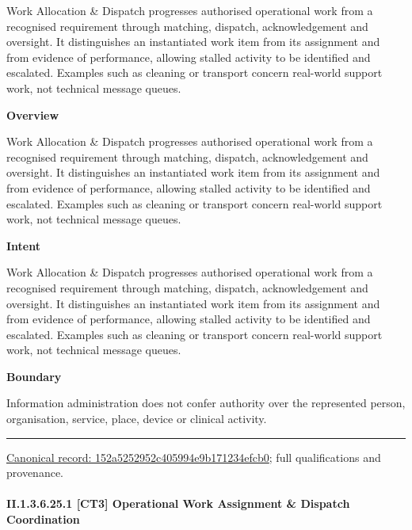Work Allocation \& Dispatch progresses authorised operational work from a recognised requirement through matching, dispatch, acknowledgement and oversight. It distinguishes an instantiated work item from its assignment and from evidence of performance, allowing stalled activity to be identified and escalated. Examples such as cleaning or transport concern real-world support work, not technical message queues.



\textbf{Overview}



Work Allocation \& Dispatch progresses authorised operational work from a recognised requirement through matching, dispatch, acknowledgement and oversight. It distinguishes an instantiated work item from its assignment and from evidence of performance, allowing stalled activity to be identified and escalated. Examples such as cleaning or transport concern real-world support work, not technical message queues.



\textbf{Intent}



Work Allocation \& Dispatch progresses authorised operational work from a recognised requirement through matching, dispatch, acknowledgement and oversight. It distinguishes an instantiated work item from its assignment and from evidence of performance, allowing stalled activity to be identified and escalated. Examples such as cleaning or transport concern real-world support work, not technical message queues.



\textbf{Boundary}



Information administration does not confer authority over the represented person, organisation, service, place, device or clinical activity.



\medskip\hrule\medskip

{\footnotesize \href{../../../../continuum/strategy/capability/152a5252952c405994e9b171234efcb0.md}{Canonical record: 152a5252952c405994e9b171234efcb0}; full qualifications and provenance.}\par
\paragraph*{II.1.3.6.25.1 [CT3] Operational Work Assignment \& Dispatch Coordination}
\label{navigation:II.1.3.6.25.1}

